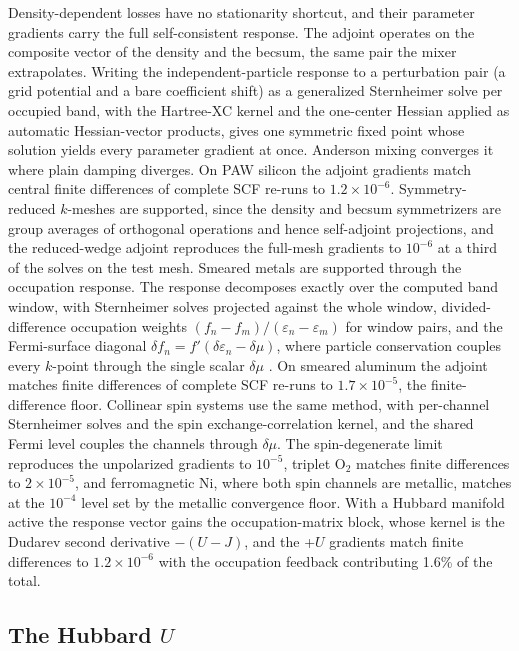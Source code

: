 \documentclass[11pt,twocolumn]{article}
\begin{document}
Density-dependent losses have no stationarity shortcut, and their
parameter gradients carry the full self-consistent response. The adjoint
operates on the composite vector of the density and the becsum, the same
pair the mixer extrapolates. Writing the independent-particle response to
a perturbation pair (a grid potential and a bare coefficient shift) as a
generalized Sternheimer solve per occupied band, with the Hartree-XC
kernel and the one-center Hessian applied as automatic Hessian-vector
products, gives one symmetric fixed point whose solution yields every
parameter gradient at once. Anderson mixing converges it where plain
damping diverges. On PAW silicon the adjoint gradients match central
finite differences of complete SCF re-runs to $1.2\times10^{-6}$.
Symmetry-reduced $k$-meshes are supported, since the density and becsum
symmetrizers are group averages of orthogonal operations and hence
self-adjoint projections, and the reduced-wedge adjoint reproduces the
full-mesh gradients to $10^{-6}$ at a third of the solves on the test
mesh. Smeared metals are supported through the occupation response. The
response decomposes exactly over the computed band window, with
Sternheimer solves projected against the whole window, divided-difference
occupation weights $(f_n - f_m)/(\varepsilon_n - \varepsilon_m)$ for
window pairs, and the Fermi-surface diagonal $\delta f_n =
f'(\delta\varepsilon_n - \delta\mu)$, where particle conservation couples
every $k$-point through the single scalar $\delta\mu$
\cite{degironcoli1995}. On smeared aluminum the adjoint matches finite
differences of complete SCF re-runs to $1.7\times10^{-5}$, the
finite-difference floor. Collinear spin systems use the same method,
with per-channel Sternheimer solves and the spin exchange-correlation
kernel, and the shared Fermi level couples the channels through
$\delta\mu$. The spin-degenerate limit reproduces the unpolarized
gradients to $10^{-5}$, triplet O$_2$ matches finite differences to
$2\times10^{-5}$, and ferromagnetic Ni, where both spin channels are
metallic, matches at the $10^{-4}$ level set by the metallic convergence
floor. With a Hubbard manifold active the response vector gains the
occupation-matrix block, whose kernel is the Dudarev second derivative
$-(U-J)$, and the +$U$ gradients match finite differences to
$1.2\times10^{-6}$ with the occupation feedback contributing 1.6\% of
the total.

\subsection{The Hubbard $U$}
\label{sec:u}
\end{document}
